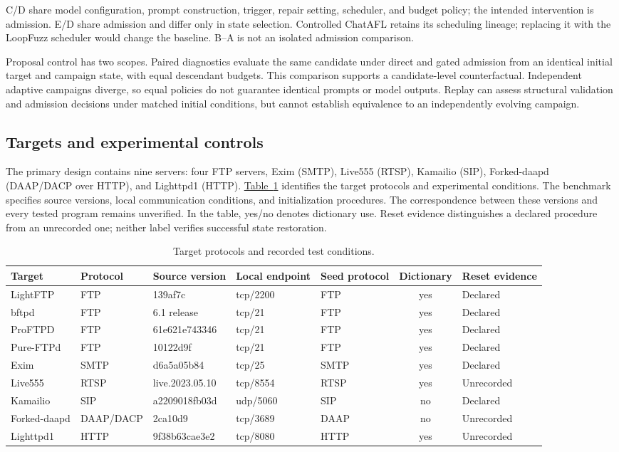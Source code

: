 \documentclass[final,5p,times,number]{elsarticle}
\newcommand{\namedref}[2]{\hyperref[#2]{#1~\ref*{#2}}}
\begin{document}
C/D share model configuration, prompt construction, trigger, repair setting, scheduler, and budget policy; the intended intervention is admission. E/D share admission and differ only in state selection. Controlled ChatAFL retains its scheduling lineage; replacing it with the LoopFuzz scheduler would change the baseline. B--A is not an isolated admission comparison.

Proposal control has two scopes. Paired diagnostics evaluate the same candidate under direct and gated admission from an identical initial target and campaign state, with equal descendant budgets. This comparison supports a candidate-level counterfactual. Independent adaptive campaigns diverge, so equal policies do not guarantee identical prompts or model outputs. Replay can assess structural validation and admission decisions under matched initial conditions, but cannot establish equivalence to an independently evolving campaign.

\subsection{Targets and experimental controls}
The primary design contains nine servers: four FTP servers, Exim (SMTP), Live555 (RTSP), Kamailio (SIP), Forked-daapd (DAAP/DACP over HTTP), and Lighttpd1 (HTTP). \namedref{Table}{tab:targets} identifies the target protocols and experimental conditions. The benchmark specifies source versions, local communication conditions, and initialization procedures. The correspondence between these versions and every tested program remains unverified. In the table, yes/no denotes dictionary use. Reset evidence distinguishes a declared procedure from an unrecorded one; neither label verifies successful state restoration.

\begin{table}[!tbp]
\centering\small
\caption{Target protocols and recorded test conditions.}
\label{tab:targets}
\begin{tabular*}{\textwidth}{@{\extracolsep{\fill}}lllllcl@{}}
\toprule
Target & Protocol & Source version & Local endpoint & Seed protocol & Dictionary & Reset evidence \\
\midrule
LightFTP & FTP & 139af7c & tcp/2200 & FTP & yes & Declared \\
bftpd & FTP & 6.1 release & tcp/21 & FTP & yes & Declared \\
ProFTPD & FTP & 61e621e743346 & tcp/21 & FTP & yes & Declared \\
Pure-FTPd & FTP & 10122d9f & tcp/21 & FTP & yes & Declared \\
Exim & SMTP & d6a5a05b84 & tcp/25 & SMTP & yes & Declared \\
Live555 & RTSP & live.2023.05.10 & tcp/8554 & RTSP & yes & Unrecorded \\
Kamailio & SIP & a2209018fb03d & udp/5060 & SIP & no & Declared \\
Forked-daapd & DAAP/DACP & 2ca10d9 & tcp/3689 & DAAP & no & Unrecorded \\
Lighttpd1 & HTTP & 9f38b63cae3e2 & tcp/8080 & HTTP & yes & Unrecorded \\
\bottomrule
\end{tabular*}
\end{table}
\end{document}
